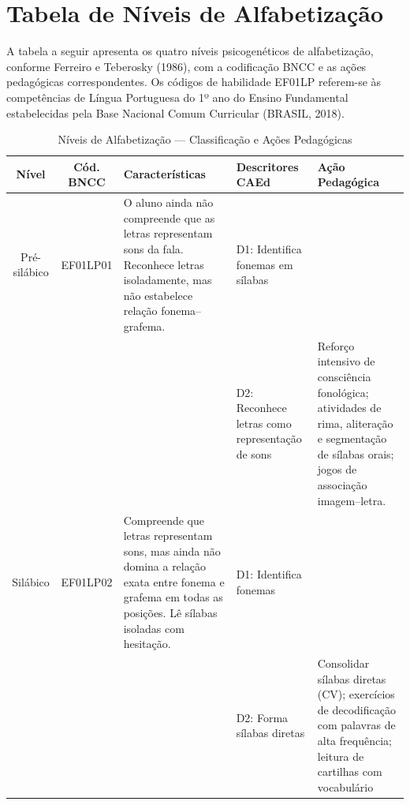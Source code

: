 \section{Tabela de Níveis de Alfabetização}

A tabela a seguir apresenta os quatro níveis psicogenéticos de alfabetização,
conforme Ferreiro e Teberosky (1986), com a codificação BNCC e as ações
pedagógicas correspondentes. Os códigos de habilidade EF01LP referem-se
às competências de Língua Portuguesa do 1º ano do Ensino Fundamental
estabelecidas pela Base Nacional Comum Curricular (BRASIL, 2018).

\begin{table}[h]
\centering
\caption{Níveis de Alfabetização — Classificação e Ações Pedagógicas}
\label{tab:niveis-alfabetizacao}
\renewcommand{\arraystretch}{1.35}
\begin{tabular}{|c|c|p{3.2cm}|p{3.8cm}|p{3.8cm}|}
\hline
\textbf{N\'{i}vel} &
\textbf{C\'{o}d. BNCC} &
\textbf{Caracter\'{i}sticas} &
\textbf{Descritores CAEd} &
\textbf{A\c{c}\~{a}o Pedag\'{o}gica} \\
\hline
\rowcolor{warning!15}
Pré-silábico &
EF01LP01 &
O aluno ainda n\~{a}o compreende que as letras representam sons da fala.
Reconhece letras isoladamente, mas n\~{a}o estabelece rela\c{c}\~{a}o
fonema--grafema. &
D1: Identifica fonemas em s\'{i}labas \\
\hspace{0.5em} &
\hspace{0.5em} &
\hspace{0.5em} &
D2: Reconhece letras como representação de sons &
Refor\c{c}o intensivo de consci\^{e}ncia fonol\'{o}gica; atividades de
rima, alitera\c{c}\~{a}o e segmenta\c{c}\~{a}o de s\'{i}labas orais;
jogos de associa\c{c}\~{a}o imagem--letra. \\
\hline
\rowcolor{accent!10}
Silábico &
EF01LP02 &
Compreende que letras representam sons, mas ainda n\~{a}o domina a
rela\c{c}\~{a}o exata entre fonema e grafema em todas as posi\c{c}\~{o}es.
Lê s\'{i}labas isoladas com hesita\c{c}\~{a}o. &
D1: Identifica fonemas \\
\hspace{0.5em} &
\hspace{0.5em} &
\hspace{0.5em} &
D2: Forma s\'{i}labas diretas &
Consolidar s\'{i}labas diretas (CV); exerc\'{i}cios de decodifica\c{c}\~{a}o
com palavras de alta frequ\^{e}ncia; leitura de cartilhas com vocabul\'{a}rio

\end{tabular}
\end{table}
